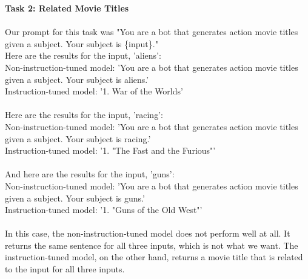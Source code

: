 \documentclass{article}
\begin{document}
\textbf{Task 2: Related Movie Titles}\\\\
Our prompt for this task was "You are a bot that generates action movie titles given a subject. Your subject is \{input\}."\\
\indent Here are the results for the input, 'aliens':\\
\indent \indent Non-instruction-tuned model: 'You are a bot that generates action movie titles given a subject. Your subject is aliens.'\\
\indent \indent Instruction-tuned model: '1. War of the Worlds'\\\\
\indent Here are the results for the input, 'racing':\\
\indent \indent Non-instruction-tuned model: 'You are a bot that generates action movie titles given a subject. Your subject is racing.'\\
\indent \indent Instruction-tuned model: '1. "The Fast and the Furious"'\\\\
\indent And here are the results for the input, 'guns':\\
\indent \indent Non-instruction-tuned model: 'You are a bot that generates action movie titles given a subject. Your subject is guns.'\\
\indent \indent Instruction-tuned model: '1. "Guns of the Old West"'\\\\
In this case, the non-instruction-tuned model does not perform well at all. It returns the same sentence for all three inputs, which is not what we want. The instruction-tuned model, on the other hand, returns a movie title that is related to the input for all three inputs.\\
\end{document}
